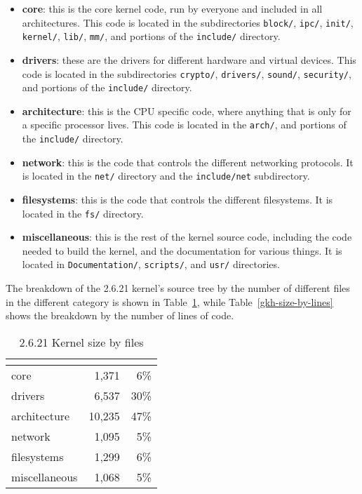 \documentclass[final]{ols}
\begin{document}
\begin {itemize}
\item \textbf{core}: this is the core kernel code, run by everyone and
included in all architectures.  This code is located in the
subdirectories
\texttt{block/},
\texttt{ipc/},
\texttt{init/},
\texttt{kernel/},
\texttt{lib/},
\texttt{mm/},
and portions of the
\texttt{include/} directory.

\item \textbf{drivers}: these are the drivers for different hardware and
virtual devices.  This code is located in the subdirectories
\texttt{crypto/},
\texttt{drivers/},
\texttt{sound/},
\texttt{security/},
and portions of the
\texttt{include/} directory.

\item \textbf{architecture}: this is the CPU specific code, where
anything that is only for a specific processor lives.  This code is
located in the
\texttt{arch/},
and portions of the
\texttt{include/} directory.

\item \textbf{network}: this is the code that controls the different
networking protocols.  It is located in the
\texttt{net/}
directory and the
\texttt{include/net} subdirectory.

\item \textbf{filesystems}: this is the code that controls the different
filesystems.  It is located in the
\texttt{fs/} directory.

\item \textbf{miscellaneous}: this is the rest of the kernel source
code, including the code needed to build the kernel, and the
documentation for various things.  It is located in
\texttt{Documentation/},
\texttt{scripts/},
and
\texttt{usr/} directories.

\end {itemize}

The breakdown of the 2.6.21 kernel's source tree by the number of
different files in the different category is shown in
Table~\ref{gkh-size-by-files}, while Table~\ref{gkh-size-by-lines} shows
the breakdown by the number of lines of code.

\begin{table}[tbph]
\begin{center}
\begin{tabular}{|l|r|r|}
\hline
\raisebox{-1.5ex}{Category} & 
\multicolumn{1}{|c|}{\raisebox{-1.5ex}{Files}} & 
\multicolumn{1}{|p{1.2cm}|}{\centering{\% of kernel}}  \\
\hline
\hline
\rule[-0.1ex]{0pt}{2.5ex}core		&  1,371	&	 6\%	\\
drivers		&  6,537	&	30\%	\\
architecture	& 10,235	&	47\%	\\
network		&  1,095	&	 5\%	\\
filesystems	&  1,299	&	 6\%	\\
miscellaneous	&  1,068	&	 5\%	\\
\hline
\end{tabular}
\caption{2.6.21 Kernel size by files}
\label{gkh-size-by-files}
\end{center}
\end{table}
\end{document}
